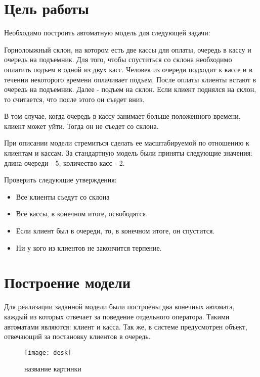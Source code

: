 







\section{Цель работы}
Необходимо построить автоматную модель для следующей задачи:

Горнолоыжный склон, на котором есть две кассы для оплаты, очередь в кассу и очередь на подъемник. Для того, чтобы спуститься со склона необходимо оплатить подъем в одной из двух касс. Человек из очереди подходит к кассе и в течении некоторого времени оплачивает подъем. После оплаты клиенты встают в очередь на подъемник. Далее - подъем на склон. Если клиент поднялся на склон, то считается, что после этого он съедет вниз.

В том случае, когда очередь в кассу занимает больше положенного времени, клиент может уйти. Тогда он не съедет со склона. 

При описании модели стремиться сделать ее масштабируемой по отношению к клиентам и кассам. За стандартную модель были приняты следующие значения: длина очереди - 5, количество касс - 2. 

Проверить следующие утверждения:
\begin{itemize}
\item Все клиенты съедут со склона
\item Все кассы, в конечном итоге, освободятся.
\item Если клиент был в очереди, то, в конечном итоге, он спустится.
\item Ни у кого из клиентов не закончится терпение.
\end{itemize}

\section{Построение модели}
Для реализации заданной модели были построены два конечных автомата, каждый из которых отвечает за поведение отдельного оператора. Такими автоматами являются: клиент и касса. Так же, в системе предусмотрен объект, отвечающий за постановку клиентов в очередь. 

\begin{figure}[H]
	\begin{center}
		\texttt{[image: desk]}
		\caption{название картинки} 
		\label{pic:desk} %
	\end{center}
\end{figure}

